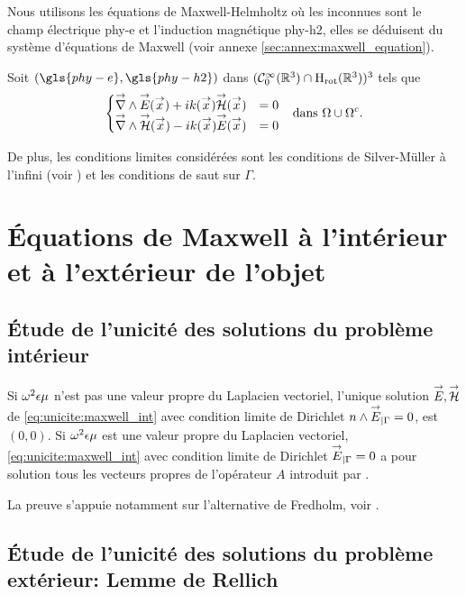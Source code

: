 
Nous utilisons les équations de Maxwell-Helmholtz où les inconnues sont le champ électrique \gls{phy-e} et l'induction magnétique \gls{phy-h2}, elles se déduisent du système d'équations de Maxwell (voir annexe \ref{sec:annex:maxwell_equation}). 

Soit \((\gls{phy-e},\gls{phy-h2})\) dans \((\mathcal{C}_0^\infty(\mathbb R^3)\cap\mathrm{H}_\mathrm{rot}(\mathbb R^3))^3\) tels que
\begin{align}
  \left\lbrace
  \begin{matrix}
    {\overset{\rightarrow}{\nabla}}\wedge {\overset{\rightarrow}{E}}({\overset{\rightarrow}{x}}) + i k({\overset{\rightarrow}{x}}) {\overset{\rightarrow}{\mathcal{H}}}({\overset{\rightarrow}{x}}) &= 0
    \\
    {\overset{\rightarrow}{\nabla}}\wedge {\overset{\rightarrow}{\mathcal{H}}}({\overset{\rightarrow}{x}}) - i k({\overset{\rightarrow}{x}}) {\overset{\rightarrow}{E}}({\overset{\rightarrow}{x}}) &= 0
  \end{matrix}
  \right. && \text{dans \(\Omega\cup\Omega^c\).}
  \label{eq:unicite:maxwell_ext}
\end{align}

De plus, les conditions limites considérées sont les conditions de Silver-Müller à l'infini (voir \cite[eq (5.2.24), p.~183]{nedelec_acoustic_2001}) et les conditions de saut sur \(\Gamma\).

\section{Équations de Maxwell à l'intérieur et à l'extérieur de l'objet}

  \subsection{Étude de l'unicité des solutions du problème intérieur}

    \begin{thm}
      Si \(\omega^2\epsilon\mu\) n'est pas une valeur propre du Laplacien vectoriel, l'unique solution \({\overset{\rightarrow}{E}},{\overset{\rightarrow}{\mathcal{H}}}\) de \eqref{eq:unicite:maxwell_int} avec condition limite de Dirichlet \(n\wedge {\overset{\rightarrow}{E}}_{|\Gamma} = 0\),  est \((0,0)\).
      Si \(\omega^2\epsilon\mu\) est une valeur propre du Laplacien vectoriel, \eqref{eq:unicite:maxwell_int} avec condition limite de Dirichlet \({\overset{\rightarrow}{E}}_{|\Gamma} = 0\) a pour solution tous les vecteurs propres de l'opérateur \(A\) introduit par \cite[eq.~(133), p.~58]{cessenat_mathematical_1996}.
    \end{thm}
    La preuve s'appuie notamment sur l'alternative de Fredholm, voir \cite[Théorème~8, p.~111]{cessenat_mathematical_1996}.

  \subsection{Étude de l'unicité des solutions du problème extérieur: Lemme de Rellich}

